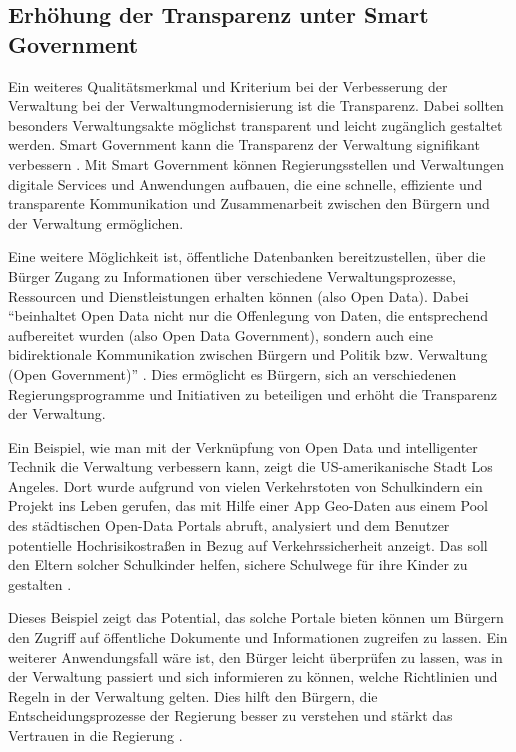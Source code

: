 \subsection{Erhöhung der Transparenz unter Smart Government}
Ein weiteres Qualitätsmerkmal und Kriterium bei der Verbesserung der Verwaltung bei der Verwaltungmodernisierung ist die Transparenz.
Dabei sollten besonders Verwaltungsakte möglichst transparent und leicht zugänglich gestaltet werden.
Smart Government kann die Transparenz der Verwaltung signifikant verbessern \citep[Vgl.][S.87]{Kersting2017}.
Mit Smart Government können Regierungsstellen und Verwaltungen digitale Services und Anwendungen aufbauen, die eine schnelle, effiziente und transparente Kommunikation und Zusammenarbeit zwischen den Bürgern und der Verwaltung ermöglichen. 
\par
Eine weitere Möglichkeit ist, öffentliche Datenbanken bereitzustellen, über die Bürger Zugang zu Informationen über verschiedene Verwaltungsprozesse, Ressourcen und Dienstleistungen erhalten können (also Open Data).
Dabei ``beinhaltet Open Data nicht nur die Offenlegung von Daten, die entsprechend aufbereitet wurden (also Open Data Government), sondern auch eine bidirektionale Kommunikation zwischen Bürgern und Politik bzw. Verwaltung (Open Government)'' \citep[Vgl.][S.94]{Kersting2017}.
Dies ermöglicht es Bürgern, sich an verschiedenen Regierungsprogramme und Initiativen zu beteiligen und erhöht die Transparenz der Verwaltung.
\par
Ein Beispiel, wie man mit der Verknüpfung von Open Data und intelligenter Technik die Verwaltung verbessern kann, zeigt die US-amerikanische Stadt Los Angeles.
Dort wurde aufgrund von vielen Verkehrstoten von Schulkindern ein Projekt ins Leben gerufen, das mit Hilfe einer App Geo-Daten aus einem Pool des städtischen Open-Data Portals abruft, analysiert und dem Benutzer potentielle Hochrisikostraßen in Bezug auf Verkehrssicherheit anzeigt.
Das soll den Eltern solcher Schulkinder helfen, sichere Schulwege für ihre Kinder zu gestalten \citep[][]{LAVisionZero2023}.
\par
Dieses Beispiel zeigt das Potential, das solche Portale bieten können um Bürgern den Zugriff auf öffentliche Dokumente und Informationen zugreifen zu lassen.
Ein weiterer Anwendungsfall wäre ist, den Bürger leicht überprüfen zu lassen, was in der Verwaltung passiert und sich informieren zu können, welche Richtlinien und Regeln in der Verwaltung gelten. 
Dies hilft den Bürgern, die Entscheidungsprozesse der Regierung besser zu verstehen und stärkt das Vertrauen in die Regierung \citep[Vgl.][S.94]{Kersting2017}.
